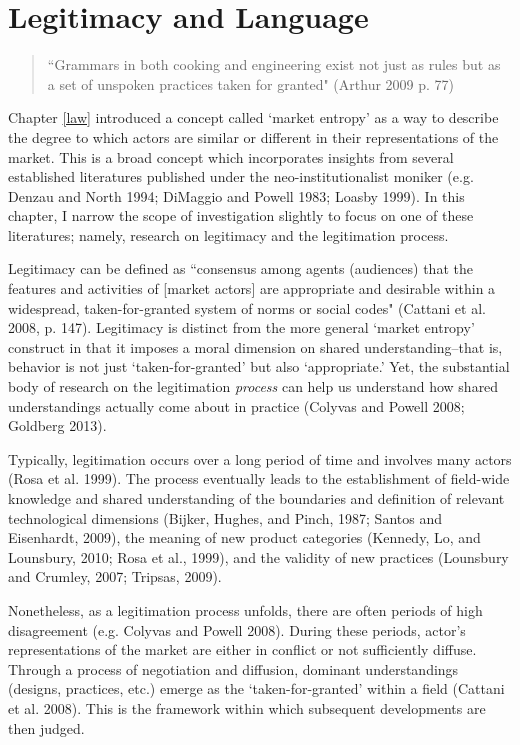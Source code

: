 \chapter{Legitimacy and Language\label{lang}}

\begin{small}
\begin{quote}
``Grammars in both cooking and engineering exist not just as rules but as a set of unspoken practices taken for granted" (Arthur 2009 p. 77)
\end{quote}
\end{small}
Chapter \ref{law} introduced a concept called `market entropy' as a way to describe the degree to which actors are similar or different in their representations of the market. This is a broad concept which incorporates insights from several established literatures published under the neo-institutionalist moniker (e.g. Denzau and North 1994; DiMaggio and Powell 1983; Loasby 1999). In this chapter, I narrow the scope of investigation slightly to focus on one of these literatures; namely, research on legitimacy and the legitimation process. 

Legitimacy can be defined as ``consensus among agents (audiences) that the features and activities of [market actors] are appropriate and desirable within a widespread, taken-for-granted system of norms or social codes" (Cattani et al. 2008, p. 147). Legitimacy is distinct from the more general `market entropy' construct in that it imposes a moral dimension on shared understanding--that is, behavior is not just `taken-for-granted' but also `appropriate.' Yet, the substantial body of research on the legitimation \emph{process} can help us understand how shared understandings actually come about in practice (Colyvas and Powell 2008; Goldberg 2013).

Typically, legitimation occurs over a long period of time and involves many actors (Rosa et al. 1999). The process eventually leads to the establishment of field-wide knowledge and shared understanding of the boundaries and definition of relevant technological dimensions (Bijker, Hughes, and Pinch, 1987; Santos and Eisenhardt, 2009), the meaning of new product categories (Kennedy, Lo, and Lounsbury, 2010; Rosa et al., 1999), and the validity of new practices (Lounsbury and Crumley, 2007; Tripsas, 2009). 

Nonetheless, as a legitimation process unfolds, there are often periods of high disagreement (e.g. Colyvas and Powell 2008). During these periods, actor's representations of the market are either in conflict or not sufficiently diffuse. Through a process of negotiation and diffusion, dominant understandings (designs, practices, etc.) emerge as the `taken-for-granted' within a field (Cattani et al. 2008). This is the framework within which subsequent developments are then judged.


